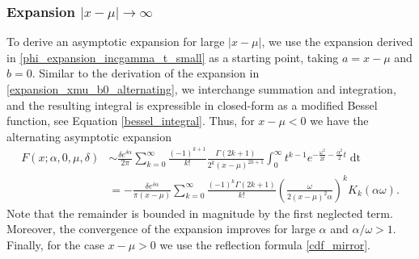 \documentclass[10pt,a4paper,oneside]{article}
\numberwithin{equation}{section}
\begin{document}
\subsubsection{Expansion $|x-\mu| \to \infty$}
To derive an asymptotic expansion for large $|x-\mu|$, we use the expansion derived in \eqref{phi_expansion_incgamma_t_small} as a starting point, taking $a = x-\mu$ and $b = 0$. Similar to the derivation of the expansion in \eqref{expansion_xmu_b0_alternating}, we interchange summation and integration, and the resulting integral is expressible in closed-form as a modified Bessel function, see Equation \eqref{bessel_integral}. Thus, for $x - \mu < 0$ we have the alternating asymptotic expansion
\begin{align}\label{asymptotic_expansion_xmu_b0}
F(x; \alpha, 0, \mu, \delta) &\sim \frac{\delta e^{\delta \alpha}}{2\pi} \sum_{k=0}^{\infty} \frac{(-1)^{k+1}}{k!} \frac{\Gamma(2k + 1)}{2^k (x-\mu)^{2k + 1}} \int_0^{\infty} t^{k-1} e^{-\frac{\omega^2}{2t} - \frac{\alpha^2}{2}t} \mathop{dt} \nonumber \\
&= -\frac{\delta e^{\delta \alpha}}{\pi (x-\mu)} \sum_{k=0}^{\infty}\frac{(-1)^k\Gamma(2k + 1)}{k!} \left(\frac{\omega}{2(x-\mu)^2\alpha}\right)^k K_k(\alpha \omega).
\end{align}
Note that the remainder is bounded in magnitude by the first neglected term. Moreover, the convergence of the expansion improves for large $\alpha$ and $\alpha / \omega > 1$. Finally, for the case $x - \mu > 0$ we use the reflection formula \eqref{cdf_mirror}.
\end{document}
